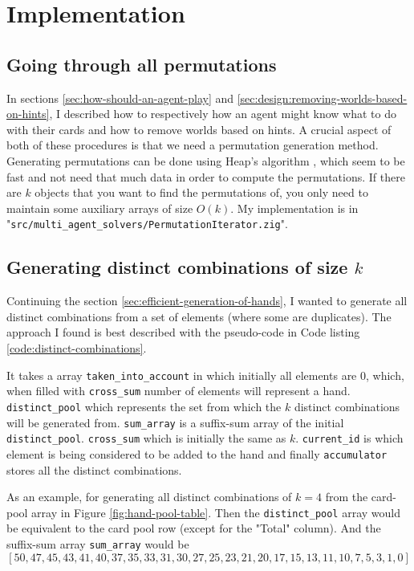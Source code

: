 \section{Implementation}

\subsection{Going through all permutations}
In sections \ref{sec:how-should-an-agent-play} and \ref{sec:design:removing-worlds-based-on-hints}, I described how to respectively how an agent might know what to do with their cards and how to remove worlds based on hints. A crucial aspect of both of these procedures is that we need a permutation generation method.
Generating permutations can be done using Heap's algorithm \cite{wiki:heapsalgorithm}, which seem to be fast and not need that much data in order to compute the permutations. If there are $k$ objects that you want to find the permutations of, you only need to maintain some auxiliary arrays of size $O(k)$. My implementation is in "{\tt src/multi\_agent\_solvers/PermutationIterator.zig}". 


\subsection{Generating distinct combinations of size $k$} \label{implementation:sec:generating-distinct-combinations}
Continuing the section \ref{sec:efficient-generation-of-hands}, I wanted to generate all distinct combinations from a set of elements (where some are duplicates). The approach I found is best described with the pseudo-code in Code listing \ref{code:distinct-combinations}. 

It takes a array {\tt  taken\_into\_account} in which initially all elements are 0, which, when filled with {\tt cross\_sum} number of elements will represent a hand. {\tt distinct\_pool} which represents the set from which the $k$ distinct combinations will be generated from. {\tt sum\_array} is a suffix-sum array of the initial {\tt distinct\_pool}. {\tt cross\_sum} which is initially the same as $k$. {\tt current\_id} is which element is being considered to be added to the hand and finally {\tt accumulator} stores all the distinct combinations.

As an example, for generating all distinct combinations of $k=4$ from the card-pool array in Figure \ref{fig:hand-pool-table}. Then the {\tt distinct\_pool} array would be equivalent to the card pool row (except for the "Total" column). And the suffix-sum array {\tt sum\_array} would be
\[
[50, 47, 45, 43, 41, 40, 37, 35, 33, 31, 30, 27, 25, 23, 21, 20, 17, 15, 13, 11, 10, 7, 5, 3, 1, 0]
\]

